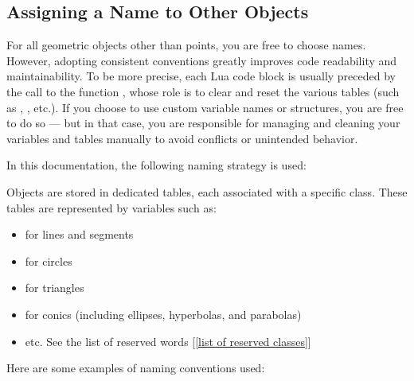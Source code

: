 
\subsection{Assigning a Name to Other Objects} %
\label{sub:assigning_a_name_to_other_objects}
For all geometric objects other than points, you are free to choose names. However, adopting consistent conventions greatly improves code readability and maintainability. To be more precise, each Lua code block is usually preceded by the call to the function , whose role is to clear and reset the various tables (such as , , etc.).
If you choose to use custom variable names or structures, you are free to do so — but in that case, you are responsible for managing and cleaning your variables and tables manually to avoid conflicts or unintended behavior.

In this documentation, the following naming strategy is used:


Objects are stored in dedicated tables, each associated with a specific class.
These tables are represented by variables such as:
\begin{itemize}

\item {} for lines and segments
\item {} for circles
\item {} for triangles
\item  {} for conics (including ellipses, hyperbolas, and parabolas)

\item  etc. See the list of reserved words [\ref{list of reserved classes}]
\end{itemize}

Here are some examples of naming conventions used:

